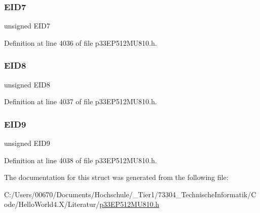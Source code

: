 \subsubsection{\texorpdfstring{E\+I\+D7}{EID7}}
{\footnotesize\ttfamily unsigned E\+I\+D7}



Definition at line 4036 of file p33\+E\+P512\+M\+U810.\+h.

\mbox{\label{structtag_c1_r_x_f5_e_i_d_b_i_t_s_acca25e0b7d86eb499d01f85222baea87}} 
\subsubsection{\texorpdfstring{E\+I\+D8}{EID8}}
{\footnotesize\ttfamily unsigned E\+I\+D8}



Definition at line 4037 of file p33\+E\+P512\+M\+U810.\+h.

\mbox{\label{structtag_c1_r_x_f5_e_i_d_b_i_t_s_ac6748f73d4ada8538b06548be4f396c2}} 
\subsubsection{\texorpdfstring{E\+I\+D9}{EID9}}
{\footnotesize\ttfamily unsigned E\+I\+D9}



Definition at line 4038 of file p33\+E\+P512\+M\+U810.\+h.



The documentation for this struct was generated from the following file\+:\begin{DoxyCompactItemize}
\item 
C\+:/\+Users/00670/\+Documents/\+Hochschule/\+\_\+\+Tier1/73304\+\_\+\+Technische\+Informatik/\+Code/\+Hello\+World4.\+X/\+Literatur/\hyperlink{p33_e_p512_m_u810_8h}{p33\+E\+P512\+M\+U810.\+h}\end{DoxyCompactItemize}
